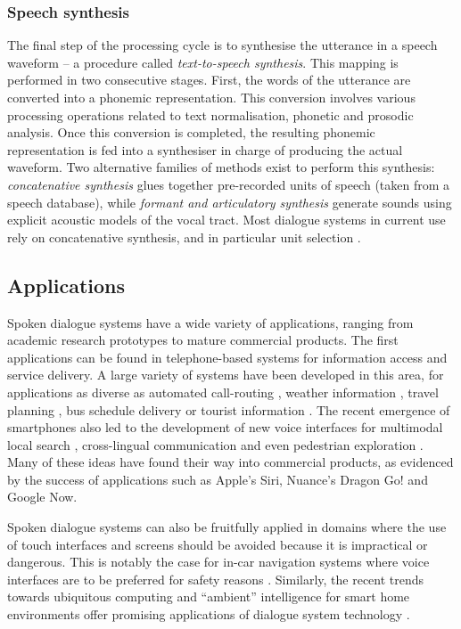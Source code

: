 \subsubsection*{Speech synthesis}
The final step of the processing cycle is to synthesise the utterance in a speech waveform --  a procedure called \textit{text-to-speech synthesis}.  This mapping is performed in two consecutive stages.  First, the words of the utterance are converted into a phonemic representation. This conversion involves various processing operations related to text normalisation, phonetic and prosodic analysis.  Once this conversion is completed, the resulting phonemic representation is fed into a synthesiser in charge of producing the actual waveform. Two alternative families of methods exist to perform this synthesis: \textit{concatenative synthesis} glues together pre-recorded units of speech (taken from a speech database), while \textit{formant and articulatory synthesis} generate sounds using explicit acoustic models of the vocal tract. Most dialogue systems in current use rely on concatenative synthesis, and in particular unit selection \citep{hunt1996}. 

\subsection{Applications}

Spoken dialogue systems have a wide variety of applications, ranging from academic research prototypes to mature commercial products. The first applications can be found in telephone-based systems for information access and service delivery.  A large variety of systems have been developed in this area, for applications as diverse as automated call-routing \citep{GorinRW97}, weather information \citep{jupiter}, travel planning \citep{walker2001}, bus schedule delivery \citep{RauxLBBE05} or tourist information \citep{lemon2006}.  The recent emergence of smartphones also led to the development of new voice interfaces for multimodal local search \citep{EhlenJ13}, cross-lingual communication \citep{yochina} and even pedestrian exploration  \citep{janarthanam2012integrating}.  Many of these ideas have found their way into commercial products, as evidenced by the success of applications such as Apple's Siri, Nuance's Dragon Go! and Google Now. 

Spoken dialogue systems can also be fruitfully applied in domains where the use of touch interfaces and screens should be avoided because it is impractical or dangerous.  This is notably the case for in-car navigation systems where voice interfaces are to be preferred for safety reasons \citep{cumove,CastronovoMPM10}.  Similarly, the recent trends towards ubiquitous computing and ``ambient'' intelligence for smart home environments offer promising applications of dialogue system technology \citep{vipperla2009a,ambient2010}.

